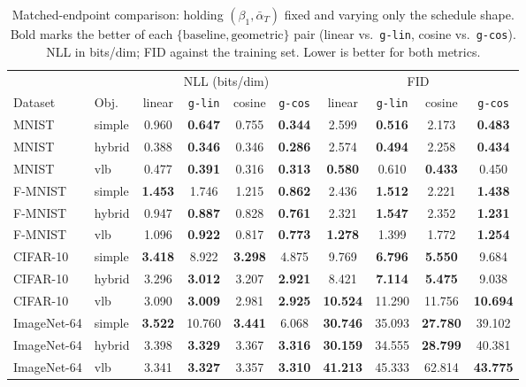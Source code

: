 \documentclass[11pt]{article}
\begin{document}
\begin{table}[ht!]
\centering
\small
\setlength{\tabcolsep}{4pt}
\caption{Matched-endpoint comparison: holding \((\beta_1,\bar\alpha_T)\) fixed and varying only the schedule shape. Bold marks the better of each \(\{\text{baseline},\text{geometric}\}\) pair (linear vs.\ \texttt{g-lin}, cosine vs.\ \texttt{g-cos}). NLL in bits/dim; FID against the training set. Lower is better for both metrics.}
\label{tab:matched_nll_fid}
\begin{tabular}{llcccccccc}
\toprule
& & \multicolumn{4}{c}{NLL (bits/dim)} & \multicolumn{4}{c}{FID} \\
\cmidrule(lr){3-6} \cmidrule(lr){7-10}
Dataset & Obj.\ & linear & \texttt{g-lin} & cosine & \texttt{g-cos} & linear & \texttt{g-lin} & cosine & \texttt{g-cos} \\
\midrule
MNIST       & simple & 0.960 & \textbf{0.647} & 0.755 & \textbf{0.344} & 2.599 & \textbf{0.516} & 2.173 & \textbf{0.483} \\
MNIST       & hybrid & 0.388 & \textbf{0.346} & 0.346 & \textbf{0.286} & 2.574 & \textbf{0.494} & 2.258 & \textbf{0.434} \\
MNIST       & vlb    & 0.477 & \textbf{0.391} & 0.316 & \textbf{0.313} & \textbf{0.580} & 0.610 & \textbf{0.433} & 0.450 \\
F-MNIST     & simple & \textbf{1.453} & 1.746 & 1.215 & \textbf{0.862} & 2.436 & \textbf{1.512} & 2.221 & \textbf{1.438} \\
F-MNIST     & hybrid & 0.947 & \textbf{0.887} & 0.828 & \textbf{0.761} & 2.321 & \textbf{1.547} & 2.352 & \textbf{1.231} \\
F-MNIST     & vlb    & 1.096 & \textbf{0.922} & 0.817 & \textbf{0.773} & \textbf{1.278} & 1.399 & 1.772 & \textbf{1.254} \\
CIFAR-10    & simple & \textbf{3.418} & 8.922 & \textbf{3.298} & 4.875 & 9.769 & \textbf{6.796} & \textbf{5.550} & 9.684 \\
CIFAR-10    & hybrid & 3.296 & \textbf{3.012} & 3.207 & \textbf{2.921} & 8.421 & \textbf{7.114} & \textbf{5.475} & 9.038 \\
CIFAR-10    & vlb    & 3.090 & \textbf{3.009} & 2.981 & \textbf{2.925} & \textbf{10.524} & 11.290 & 11.756 & \textbf{10.694} \\
ImageNet-64 & simple & \textbf{3.522} & 10.760 & \textbf{3.441} & 6.068 & \textbf{30.746} & 35.093 & \textbf{27.780} & 39.102 \\
ImageNet-64 & hybrid & 3.398 & \textbf{3.329} & 3.367 & \textbf{3.316} & \textbf{30.159} & 34.555 & \textbf{28.799} & 40.381 \\
ImageNet-64 & vlb    & 3.341 & \textbf{3.327} & 3.357 & \textbf{3.310} & \textbf{41.213} & 45.333 & 62.814 & \textbf{43.775} \\
\bottomrule
\end{tabular}
\end{table}
\end{document}
